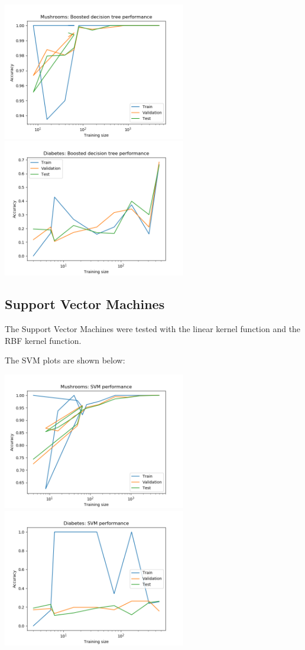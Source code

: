 \documentclass[11pt]{article}
\begin{document}
        \includegraphics[width=8cm]{mushrooms/mushroom_boost_trainingsize.png}
        \includegraphics[width=8cm]{diabetes/diabetes_boost_trainingsize.png}

        \subsection{Support Vector Machines}
        The Support Vector Machines were tested with the linear kernel function and the RBF kernel function.

        The SVM plots are shown below:

        \includegraphics[width=8cm]{mushrooms/mushroom_svm_trainingsize.png}
        \includegraphics[width=8cm]{diabetes/diabetes_svm_trainingsize.png}
\end{document}
